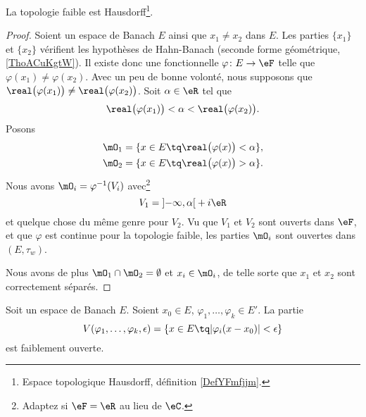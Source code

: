 \begin{lemma}
	La topologie faible est Hausdorff\footnote{Espace topologique Hausdorff, définition \ref{DefYFmfjjm}.}.
\end{lemma}

\begin{proof}
	Soient un espace de Banach \( E\) ainsi que \( x_1\neq x_2\) dans \( E\). Les parties \( \{ x_1 \}\) et \( \{ x_2 \}\) vérifient les hypothèses de Hahn-Banach (seconde forme géométrique, \ref{ThoACuKgtW}). Il existe donc une fonctionnelle \( \varphi\colon E\to \eF\) telle que \( \varphi(x_1)\neq \varphi(x_2)\). Avec un peu de bonne volonté, nous supposons que \( \real\big( \varphi(x_1) \big)\neq \real\big( \varphi(x_2) \big)\). Soit \( \alpha\in \eR\) tel que
	\begin{equation}
		\real\big( \varphi(x_1) \big)<\alpha <\real\big( \varphi(x_2) \big).
	\end{equation}
	Posons
	\begin{subequations}
		\begin{align}
			\mO_1 & =\{ x\in E\tq\real\big( \varphi(x) \big)< \alpha \}, \\
			\mO_2 & =\{ x\in E\tq\real\big( \varphi(x) \big)> \alpha \}.
		\end{align}
	\end{subequations}
	Nous avons \( \mO_i=\varphi^{-1}(V_i)\) avec\footnote{Adaptez si \( \eF=\eR\) au lieu de \( \eC\).}
	\begin{equation}
		V_1= \mathopen] -\infty , \alpha \mathclose[+i\eR
	\end{equation}
	et quelque chose du même genre pour \( V_2\). Vu que \( V_1\) et \( V_2\) sont ouverts dans \( \eF\), et que \( \varphi\) est continue pour la topologie faible, les parties \( \mO_i\) sont ouvertes dans \( (E,\tau_w)\).

	Nous avons de plus \( \mO_1\cap\mO_2=\emptyset\) et \( x_i\in \mO_i\), de telle sorte que \( x_1\) et \( x_2\) sont correctement séparés.
\end{proof}

\begin{lemma}
	Soit un espace de Banach \( E\). Soient \( x_0\in E\), \( \varphi_1,\ldots, \varphi_k\in E'\). La partie
	\begin{equation}
		V(\varphi_1,\ldots, \varphi_k,\epsilon)=\{ x\in E\tq | \varphi_i(x-x_0) |<\epsilon \}
	\end{equation}
	est faiblement ouverte.
\end{lemma}

